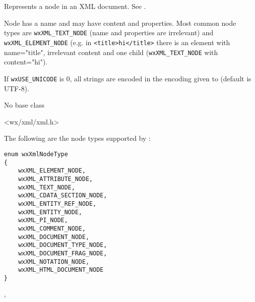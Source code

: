 
\section{}\label{wxxmlnode}

Represents a node in an XML document. See .

Node has a name and may have content
and properties. Most common node types are {\tt wxXML\_TEXT\_NODE} (name and
properties are irrelevant) and {\tt wxXML\_ELEMENT\_NODE} (e.g. in {\tt <title>hi</title>} there is
an element with name="title", irrelevant content and one child ({\tt wxXML\_TEXT\_NODE}
with content="hi").

If \texttt{wxUSE\_UNICODE} is 0, all strings are encoded in the encoding given to
 (default is UTF-8).



No base class


<wx/xml/xml.h>


The following are the node types supported by :

{\small
\begin{verbatim}
enum wxXmlNodeType
{
    wxXML_ELEMENT_NODE,
    wxXML_ATTRIBUTE_NODE,
    wxXML_TEXT_NODE,
    wxXML_CDATA_SECTION_NODE,
    wxXML_ENTITY_REF_NODE,
    wxXML_ENTITY_NODE,
    wxXML_PI_NODE,
    wxXML_COMMENT_NODE,
    wxXML_DOCUMENT_NODE,
    wxXML_DOCUMENT_TYPE_NODE,
    wxXML_DOCUMENT_FRAG_NODE,
    wxXML_NOTATION_NODE,
    wxXML_HTML_DOCUMENT_NODE
}
\end{verbatim}
}


, 




